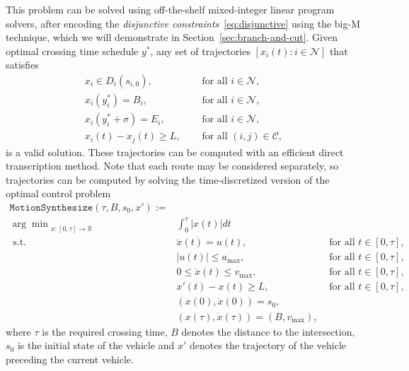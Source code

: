 \documentclass[a4paper]{article}
\theoremstyle{definition}
\theoremstyle{plain}
\begin{document}
This problem can be solved using off-the-shelf mixed-integer linear program solvers,
after encoding the \textit{disjunctive constraints}~\eqref{eq:disjunctive} using
the big-M technique, which we will demonstrate in
Section~\ref{sec:branch-and-cut}. Given optimal crossing time schedule $y^{*}$, any set of trajectories
$[x_{i}(t) : i \in \mathcal{N}]$ that satisfies
\begin{align*}
  x_{i} \in D_{i}(s_{i,0}) , \quad & \text{ for all } i \in \mathcal{N} , \\
  x_{i}(y^{*}_i) = B_{i} , \quad & \text{ for all } i \in \mathcal{N} , \\
  x_{i}(y^{*}_i + \sigma) = E_{i} , \quad & \text{ for all } i \in \mathcal{N} , \\
  x_{i}(t) - x_{j}(t) \geq L , \quad & \text{ for all } (i,j) \in \mathcal{C} ,
\end{align*}
is a valid solution. These trajectories can be computed with an efficient direct
transcription method. Note that each route may be considered separately, so
trajectories can be computed by solving the time-discretized version of the
optimal control problem
%
\begin{align*}
\texttt{MotionSynthesize}(\tau, B, s_{0}, x') := \\
  {\arg\min}_{x: [0, \tau] \rightarrow \mathbb{R}} & \int_{0}^{\tau} |x(t)| dt \\
  \text{ s.t. } & \ddot{x}(t) = u(t) , &  \text{ for all } t \in [0, \tau] , \\
  & |u(t)| \leq a_{\max} , &  \text{ for all } t \in [0, \tau] , \\
  & 0 \leq \dot{x}(t) \leq v_{\max} , &  \text{ for all } t \in [0, \tau] , \\
  & x'(t) - x(t) \geq L , &  \text{ for all } t \in [0, \tau] , \\
  & (x(0), \dot{x}(0)) = s_{0} , \\
  & (x(\tau), \dot{x}(\tau)) = (B, v_{\max}) ,
\end{align*}
where $\tau$ is the required crossing time, $B$ denotes the distance to
the intersection, $s_{0}$ is the initial state of the vehicle and $x'$ denotes
the trajectory of the vehicle preceding the current vehicle.
\end{document}
